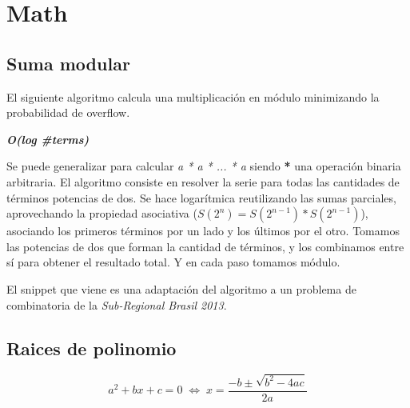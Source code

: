 \section{Math}

\subsection*{Suma modular}

El siguiente algoritmo calcula una multiplicación en módulo minimizando la probabilidad de overflow.

\textit{\textbf{O(log \#terms)}}

Se puede generalizar para calcular \textit{a * a * ... * a} siendo \textbf{*} una operación binaria
arbitraria. El algoritmo consiste en resolver la serie para todas las cantidades
de términos potencias de dos. Se hace logarítmica reutilizando las sumas parciales, aprovechando
la propiedad asociativa ($S(2^n) = S(2^{n-1}) * S(2^{n-1})$), asociando los primeros términos
por un lado y los últimos por el otro. Tomamos las potencias de dos que forman la cantidad de
términos, y los combinamos entre sí para obtener el resultado total. Y en cada paso tomamos
módulo.

El snippet que viene es una adaptación del algoritmo a un problema de combinatoria de la
\textit{Sub-Regional Brasil 2013}.



\subsection*{Raices de polinomio}

\begin{equation*}
    a^2 + bx + c = 0 \; \Longleftrightarrow \; x = \frac{-b \pm \sqrt{b^2 - 4ac}}{2a}
\end{equation*}